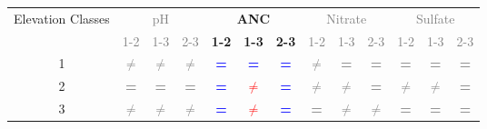 \begin{table}\scriptsize
\begin{center}
\begin{tabular}{ccccccccccccc}
\toprule
\multicolumn{1}{p{1cm}}{Elevation Classes}& \multicolumn{ 3}{c}{\textcolor{gray}{pH}}                                                                & \multicolumn{ 3}{c}{\textbf{ANC}}                                         & \multicolumn{ 3}{c}{\textcolor{gray}{Nitrate}}                                         & \multicolumn{ 3}{c}{\textcolor{gray}{Sulfate}}                                 \\ \cline{2-13}\noalign{\smallskip}
                                                                       & \multicolumn{ 1}{c}{\textcolor{gray}{1-2}} & \textcolor{gray}{1-3}                       & \textcolor{gray}{2-3}                      & \textbf{1-2}             & \textbf{1-3}                        & \textbf{2-3}                      & \textcolor{gray}{1-2}                     & \textcolor{gray}{1-3}                      & \textcolor{gray}{2-3}                     & \textcolor{gray}{1-2}                       & \textcolor{gray}{1-3}                     & \textcolor{gray}{2-3}             \\  \cline{2-13}
\multicolumn{1}{c}{1}                                    & \textcolor{gray}{\textbf{$\neq$}}               & \textcolor{gray}{\textbf{$\neq$}}  & \textcolor{gray}{\textbf{$\neq$}} & \textcolor{blue}{\textbf{=}} & \textcolor{blue}{\textbf{=}}           & \textcolor{blue}{\textbf{=}}          & \textcolor{gray}{\textbf{$\neq$}} & \textcolor{gray}{\textbf{=}}         & \textcolor{gray}{\textbf{=}}          & \textcolor{gray}{\textbf{=}}          & \textcolor{gray}{\textbf{=}}         & \textcolor{gray}{\textbf{=}} \\ 
\multicolumn{1}{c}{2}                                    & \textcolor{gray}{\textbf{=}}                        & \textcolor{gray}{\textbf{=}}          & \textcolor{gray}{\textbf{=}}          & \textcolor{blue}{\textbf{=}} & \textcolor{red}{\textbf{$\neq$}}    & \textcolor{blue}{\textbf{=}}          & \textcolor{gray}{\textbf{$\neq$}} & \textcolor{gray}{\textbf{$\neq$}} & \textcolor{gray}{\textbf{=}}          & \textcolor{gray}{\textbf{$\neq$}} & \textcolor{gray}{\textbf{$\neq$}} & \textcolor{gray}{\textbf{=}} \\ 
\multicolumn{1}{c}{3}                                    & \textcolor{gray}{\textbf{$\neq$}}               & \textcolor{gray}{\textbf{$\neq$}}  & \textcolor{gray}{\textbf{$\neq$}} & \textcolor{blue}{\textbf{=}} & \textcolor{red}{\textbf{$\neq$}}    & \textcolor{blue}{\textbf{=}}          & \textcolor{gray}{\textbf{=}}          & \textcolor{gray}{\textbf{$\neq$}} & \textcolor{gray}{\textbf{$\neq$}} & \textcolor{gray}{\textbf{=}}          & \textcolor{gray}{\textbf{=}}         &\textcolor{gray}{\textbf{=}} \\ 

\end{tabular}
\end{center}
\end{table}
